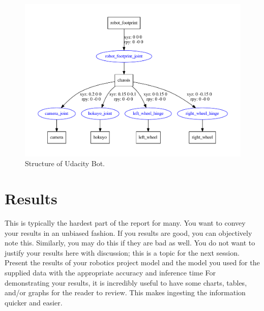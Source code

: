 \documentclass[10pt,journal,compsoc]{IEEEtran}
\begin{document}
\begin{figure}[thpb]
      \centering
      \includegraphics[width=\linewidth]{misc/udacity_bot.pdf}
      \caption{Structure of Udacity Bot.}
      \label{fig:udacity_bot}
\end{figure}





\section{Results}
This is typically the hardest part of the report for many. You want to convey your results in an unbiased fashion. If you results are good, you can objectively note this. Similarly, you may do this if they are bad as well. You do not want to justify your results here with discussion; this is a topic for the next session. 
Present the results of your robotics project model and the model you used for the supplied data with the appropriate accuracy and inference time
For demonstrating your results, it is incredibly useful to have some charts, tables, and/or graphs for the reader to review. This makes ingesting the information quicker and easier.
\end{document}
